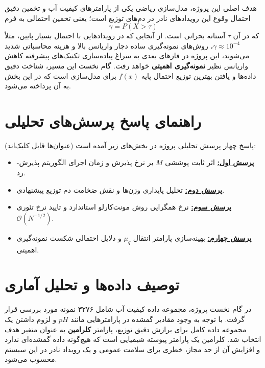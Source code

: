\documentclass[12pt,a4paper]{article}
\begin{document}
	هدف اصلی این پروژه، مدل‌سازی ریاضی یکی از پارامترهای کیفیت آب و تخمین دقیق احتمال وقوع این رویدادهای نادر در دم‌های توزیع  است؛ یعنی تخمین احتمالی به فرم
	\[
	\gamma = P(X > \tau)
	\]
	که در آن $\tau$ آستانه بحرانی است. از آنجایی که در رویدادهایی با احتمال بسیار پایین، مثلاً $\gamma \approx 10^{-4}$، روش‌های نمونه‌گیری ساده  دچار واریانس بالا و هزینه محاسباتی شدید می‌شوند، این پروژه در فازهای بعدی به سراغ پیاده‌سازی تکنیک‌های پیشرفته کاهش واریانس نظیر \textbf{نمونه‌گیری اهمیتی } خواهد رفت. گام نخست این مسیر، شناخت دقیق داده‌ها و یافتن بهترین توزیع احتمال پایه $f(x)$ برای مدل‌سازی است که در این بخش به آن پرداخته می‌شود.
	
	
\section*{راهنمای پاسخ پرسش‌های تحلیلی}

پاسخ چهار پرسش تحلیلی پروژه در بخش‌های زیر آمده است (عنوان‌ها قابل کلیک‌اند):

\begin{itemize}[leftmargin=2em, itemsep=0.4em]
	\item \hyperref[sec:q1]{\textbf{پرسش اول:}} اثر ثابت پوششی $M$ بر نرخ پذیرش و زمان اجرای الگوریتم پذیرش-رد.
	\item \hyperref[sec:q2]{\textbf{پرسش دوم:}} تحلیل پایداری وزن‌ها و نقش ضخامت دم توزیع پیشنهادی.
	\item \hyperref[sec:q3]{\textbf{پرسش سوم:}} نرخ همگرایی روش مونت‌کارلو استاندارد و تایید نرخ تئوری $\mathcal{O}(N^{-1/2})$.
	\item \hyperref[sec:q4]{\textbf{پرسش چهارم:}} بهینه‌سازی پارامتر انتقال $\mu_q$ و دلایل احتمالی شکست نمونه‌گیری اهمیتی.
\end{itemize}

	
	\section{توصیف داده‌ها و تحلیل آماری }
	
	در گام نخست پروژه، مجموعه داده کیفیت آب  شامل ۳۲۷۶ نمونه مورد بررسی قرار گرفت. با توجه به وجود مقادیر گمشده  در پارامترهایی مانند $pH$ و لزوم داشتن یک مجموعه داده کامل برای برازش دقیق توزیع، پارامتر \textbf{کلرامین } به عنوان متغیر هدف انتخاب شد. کلرامین یک پارامتر پیوسته شیمیایی است که هیچ‌گونه داده گمشده‌ای ندارد و افزایش آن از حد مجاز، خطری برای سلامت عمومی و یک رویداد نادر در این سیستم محسوب می‌شود.
	
\end{document}
